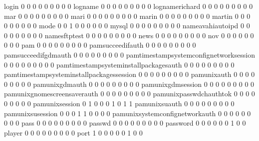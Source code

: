 \documentclass[compress,8pt]{beamer}
\begin{document}
\begin{frame}
\begin{Schunk}
  login                                      0   0   0   0   0   0   0   0   0
  logname                                    0   0   0   0   0   0   0   0   0
  lognamerichard                             0   0   0   0   0   0   0   0   0
  mar                                        0   0   0   0   0   0   0   0   0
  mari                                       0   0   0   0   0   0   0   0   0
  marin                                      0   0   0   0   0   0   0   0   0
  martin                                     0   0   0   0   0   0   0   0   0
  mode                                       0   0   1   0   0   0   0   0   0
  mysql                                      0   0   0   0   0   0   0   0   0
  nameavahiautoipd                           0   0   0   0   0   0   0   0   0
  namesftptest                               0   0   0   0   0   0   0   0   0
  news                                       0   0   0   0   0   0   0   0   0
  nov                                        0   0   0   0   0   0   0   0   0
  pam                                        0   0   0   0   0   0   0   0   0
  pamsucceedifauth                           0   0   0   0   0   0   0   0   0
  pamsucceedifgdmauth                        0   0   0   0   0   0   0   0   0
  pamtimestampsystemconfignetworksession     0   0   0   0   0   0   0   0   0
  pamtimestampsysteminstallpackagesauth      0   0   0   0   0   0   0   0   0
  pamtimestampsysteminstallpackagessession   0   0   0   0   0   0   0   0   0
  pamunixauth                                0   0   0   0   0   0   0   0   0
  pamunixgdmauth                             0   0   0   0   0   0   0   0   0
  pamunixgdmsession                          0   0   0   0   0   0   0   0   0
  pamunixgnomescreensaverauth                0   0   0   0   0   0   0   0   0
  pamunixpasswdchauthtok                     0   0   0   0   0   0   0   0   0
  pamunixsession                             0   1   0   0   0   1   0   1   1
  pamunixsuauth                              0   0   0   0   0   0   0   0   0
  pamunixsusession                           0   0   0   1   1   0   0   0   0
  pamunixsystemconfignetworkauth             0   0   0   0   0   0   0   0   0
  pass                                       0   0   0   0   0   0   0   0   0
  passwd                                     0   0   0   0   0   0   0   0   0
  password                                   0   0   0   0   0   0   1   0   0
  player                                     0   0   0   0   0   0   0   0   0
  port                                       1   0   0   0   0   0   1   0   0

\end{Schunk}
\end{frame}
\end{document}
